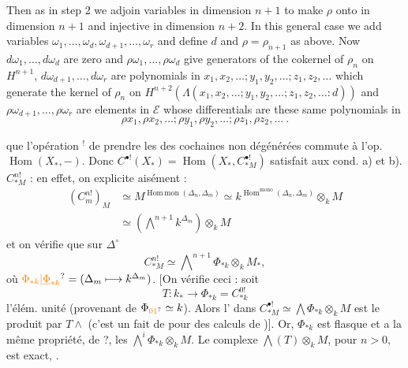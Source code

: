 Then as in step 2 we adjoin variables in dimension $n+1$ to make $\rho$ onto in dimension $n+1$ and injective in dimension $n+2$. In this general case we add variables $\omega_1,\ldots,\omega_d,\omega_{d+1},\ldots,\omega_r$ and define $d$ and $\rho=\rho_{n+1}$ as above. Now $d\omega_1,\ldots,d\omega_d$ are zero and $\rho\omega_1,\ldots,\rho\omega_d$ give generators of the cokernel of $\rho_n$ on $H^{n+1}$, $d\omega_{d+1},\ldots,d\omega_r$ are polynomials in $x_1,x_2,\ldots;y_1,y_2,\ldots;z_1,z_2,\ldots$ which generate the kernel of $\rho_n$ on $H^{n+2}(\Lambda(x_1,x_2,\ldots;y_1,y_2,\ldots;z_1,z_2,\ldots:d))$ and $\rho\omega_{d+1},\ldots,\rho\omega_r$ are elements in $\mathcal{E}$ whose differentials are these same polynomials in
\[
 \rho x_1,\rho x_2,\ldots;\rho y_1,\rho y_2,\ldots;\rho z_1,\rho z_2,\ldots\ .
\]

 que l'opération $^{!}$ de prendre les  des cochaines non dégénérées commute à l'op. $\operatorname{Hom}(X_*,-)$. Donc $C^{\bullet!}(X_*)=\operatorname{Hom}(X_*,C_{*M}^{\bullet!})$ satisfait aux cond. a) et b).  $C_{*M}^{n!}$  : en effet, on explicite aisément :
\[
\begin{aligned}
 (C_m^{n!})_M&\simeq M^{\operatorname{Hom\,mon}(\Delta_n,\Delta_m)}
 \simeq k^{\operatorname{Hom}^{\mathrm{mono}}(\Delta_n,\Delta_m)}\otimes_k M\\
 &\simeq(\bigwedge\nolimits^{n+1} k^{\Delta_m})\otimes_k M
\end{aligned}
\]
et on vérifie que  sur $\Delta^\circ$
\[
 C_{*M}^{n!}\simeq\bigwedge\nolimits^{n+1}\Phi_{*k}\otimes_k M_*,
\]
où $\unsure{\Phi_{*k}|\underline{\Phi}_{*k}}=(\Delta_m\longmapsto k^{\Delta_m})$. [On vérifie   ceci : soit
\[
 T\colon k_*\longrightarrow\Phi_{*k}=C_{*k}^{0!}
\]
l'élém. unité (provenant de $\Phi_{\unsure{01}}\simeq k$). Alors l' dans $C_{*M}^{\bullet!}\simeq\bigwedge\Phi_{*k}\otimes_k M$ est le produit par $T\wedge$ (c'est un fait de   pour des calculs de )]. Or, $\Phi_{*k}$ est flasque et a la même propriété, de  ?, les  $\bigwedge^i\Phi_{*k}\otimes_k M$. Le complexe $\bigwedge(T)\otimes_k M$, pour $n>0$, est  exact, .

